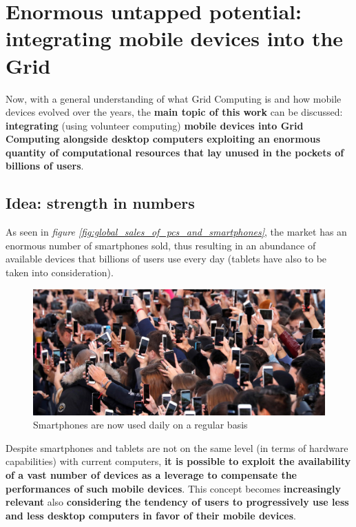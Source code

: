 \section{Enormous untapped potential: integrating mobile devices into the Grid}\label{untapped_enormous_potential}
Now, with a general understanding of what Grid Computing is and how mobile devices evolved over the years, the \textbf{main topic of this work} can be discussed: \textbf{integrating} (using volunteer computing) \textbf{mobile devices into Grid Computing alongside desktop computers exploiting an enormous quantity of computational resources that lay unused in the pockets of billions of users}.

\subsection{Idea: strength in numbers}
As seen in \textit{figure \ref{fig:global_sales_of_pcs_and_smartphones}}, the market has an enormous number of smartphones sold, thus resulting in an abundance of available devices that billions of users use every day (tablets have also to be taken into consideration).

\begin{figure}[!ht]
    \centering
    \includegraphics[scale=1.2]{document/chapters/chapter_1/images/people_using_smartphones.jpg}
    \caption{Smartphones are now used daily on a regular basis}
    \label{fig:people_using_smartphones}
\end{figure}

Despite smartphones and tablets are not on the same level (in terms of hardware capabilities) with current computers, \textbf{it is possible to exploit the availability of a vast number of devices as a leverage to compensate the performances of such mobile devices}.
This concept becomes \textbf{increasingly relevant} also \textbf{considering the tendency of users to progressively use less and less desktop computers in favor of their mobile devices}.

